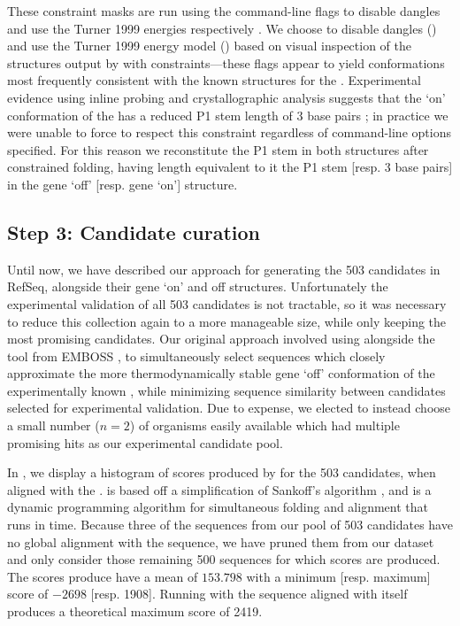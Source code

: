 These constraint masks are run using the command-line flags
 to disable dangles and use the Turner 1999
energies respectively \citep{mathews:1999jw}. We choose to disable dangles () and use
the Turner 1999 energy model ()
based on visual inspection of the structures output by \rfold with
constraints---these flags appear to yield conformations most frequently consistent
with the known structures for the \Bsxpt \grb.
Experimental evidence using inline probing and
crystallographic analysis suggests that
the `on' conformation of the \grb has a reduced P1 stem length of 3 base pairs
\citep{mandalboesebarrickwinklerbreaker,serganov:2004dq};
in practice we were unable to force \rfold to respect this constraint regardless
of command-line options specified. For this reason we reconstitute the P1 stem in
both structures after constrained folding, having length equivalent to it the
\infernal P1 stem [resp. 3 base pairs] in the gene `off' [resp. gene `on']
structure.

\subsection{Step 3: Candidate curation}
\label{subsec:rfinder:curation}

Until now, we have described our approach for generating the 503 \grb candidates
in RefSeq, alongside their gene `on' and off structures. Unfortunately the
experimental validation of all 503 candidates is not tractable, so it was
necessary to reduce this collection again to a more manageable size, while only
keeping the most promising candidates. Our original approach involved using
\foldalign \citep{gorodkin:1997tr,havgaard:2007ca} alongside the  tool from EMBOSS
\citep{rice:2000wr}, to simultaneously
select sequences which closely approximate the more thermodynamically stable
gene `off' conformation of the experimentally known \Bsxpt \grb, while minimizing
sequence similarity between candidates selected for experimental validation. Due to
expense, we elected to instead choose a small number
($n = 2$) of organisms easily available which had multiple promising hits as our
experimental candidate pool.

In , we display a histogram of scores produced
by \foldalign for the 503 candidates, when aligned with the \Bsxpt \grb. \foldalign
is based off a simplification of Sankoff's algorithm \citep{sankoff:1985wc}, and
is a dynamic programming
algorithm for simultaneous folding and alignment that runs in  time. Because three of the sequences from our pool of 503 candidates have
no global alignment with the \Bsxpt sequence, we have pruned them from our
dataset and only consider those remaining 500 sequences for which \foldalign
scores are produced. The \foldalign scores produce have a mean of $153.798$ with a
minimum [resp. maximum] score of $-2698$ [resp. 1908]. Running \foldalign with the
\Bsxpt sequence aligned with itself produces a theoretical maximum score of 2419.

